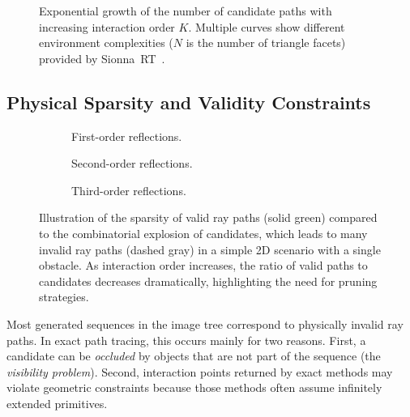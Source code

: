\begin{figure}
  \centering
  \caption{Exponential growth of the number of candidate paths with increasing interaction order $K$. Multiple curves show different environment complexities ($N$ is the number of triangle facets) provided by Sionna~RT~\cite{Hoydis2023}.}
\end{figure}

\subsection{Physical Sparsity and Validity Constraints}

\begin{figure}
  \centering
  \begin{subfigure}[t]{0.32\contentwidth}
    \centering
    \caption{First-order reflections.}
  \end{subfigure}
  \begin{subfigure}[t]{0.32\contentwidth}
    \centering
    \caption{Second-order reflections.}
  \end{subfigure}
  \begin{subfigure}[t]{0.32\contentwidth}
    \centering
    \caption{Third-order reflections.}
  \end{subfigure}
  \caption{Illustration of the sparsity of valid ray paths (solid green) compared to the combinatorial explosion of candidates, which leads to many invalid ray paths (dashed gray) in a simple 2D scenario with a single obstacle. As interaction order increases, the ratio of valid paths to candidates decreases dramatically, highlighting the need for pruning strategies.}
\end{figure}

Most generated sequences in the image tree correspond to physically invalid ray paths. In exact path tracing, this occurs mainly for two reasons. First, a candidate can be \emph{occluded} by objects that are not part of the sequence (the \emph{visibility problem}). Second, interaction points returned by exact methods may violate geometric constraints because those methods often assume infinitely extended primitives.


